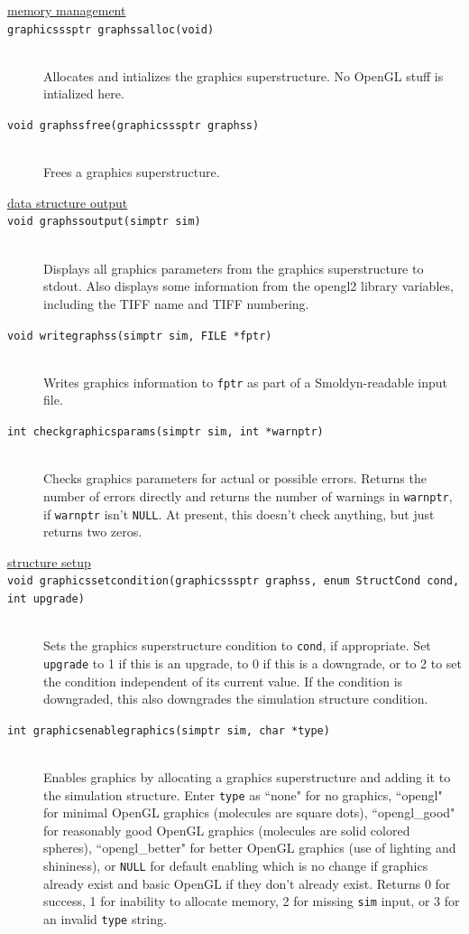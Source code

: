 \documentclass {scrbook}
\newcommand {\ttt} {\texttt}
\begin{document}
\begin{description}
\item[\underline{memory management}]

\item[\ttt{graphicsssptr graphssalloc(void)}]
\hfill \\
Allocates and intializes the graphics superstructure. No OpenGL stuff is intialized here.

\item[\ttt{void graphssfree(graphicsssptr graphss)}]
\hfill \\
Frees a graphics superstructure.

\item[\underline{data structure output}]

\item[\ttt{void graphssoutput(simptr sim)}]
\hfill \\
Displays all graphics parameters from the graphics superstructure to stdout. Also displays some information from the opengl2 library variables, including the TIFF name and TIFF numbering.

\item[\ttt{void writegraphss(simptr sim, FILE *fptr)}]
\hfill \\
Writes graphics information to \ttt{fptr} as part of a Smoldyn-readable input file.

\item[\ttt{int checkgraphicsparams(simptr sim, int *warnptr)}]
\hfill \\
Checks graphics parameters for actual or possible errors. Returns the number of errors directly and returns the number of warnings in \ttt{warnptr}, if \ttt{warnptr} isn't \ttt{NULL}. At present, this doesn't check anything, but just returns two zeros.

\item[\underline{structure setup}]

\item[\ttt{void graphicssetcondition(graphicsssptr graphss, enum StructCond cond, int upgrade)}]
\hfill \\
Sets the graphics superstructure condition to \ttt{cond}, if appropriate. Set \ttt{upgrade} to 1 if this is an upgrade, to 0 if this is a downgrade, or to 2 to set the condition independent of its current value. If the condition is downgraded, this also downgrades the simulation structure condition.

\item[\ttt{int graphicsenablegraphics(simptr sim, char *type)}]
\hfill \\
Enables graphics by allocating a graphics superstructure and adding it to the simulation structure. Enter \ttt{type} as ``none" for no graphics, ``opengl" for minimal OpenGL graphics (molecules are square dots), ``opengl\_good" for reasonably good OpenGL graphics (molecules are solid colored spheres), ``opengl\_better" for better OpenGL graphics (use of lighting and shininess), or \ttt{NULL} for default enabling which is no change if graphics already exist and basic OpenGL if they don't already exist. Returns 0 for success, 1 for inability to allocate memory, 2 for missing \ttt{sim} input, or 3 for an invalid \ttt{type} string.


\end{description}
\end{document}
